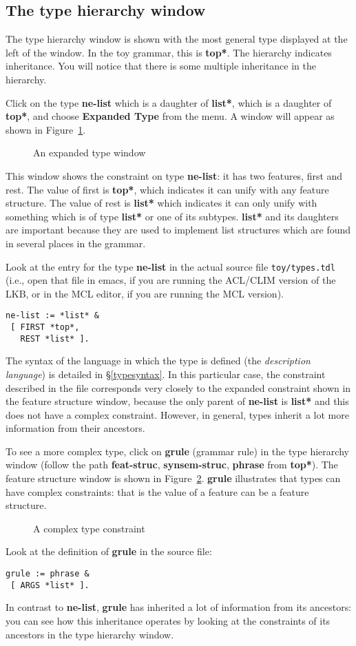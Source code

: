 \documentclass[12pt]{report}
\begin{document}
\subsection{The type hierarchy window}
The type hierarchy window is shown 
with the most
general type displayed at the left of the window.  In the toy grammar, 
this is {\bf *top*}.  The hierarchy indicates inheritance.
You will notice that there is some multiple inheritance in the hierarchy.

Click on the type {\bf ne-list}
which is a daughter of {\bf *list*}, which is a daughter of {\bf *top*},
and choose {\bf Expanded Type} from the menu.  A window will appear
as shown in Figure~\ref{ne-list}.
\begin{figure}
\epsfxsize=1in
\caption{An expanded type window}
\label{ne-list}
\end{figure}
This window shows the constraint on type {\bf ne-list}: it has
two features, {\sc first} and {\sc rest}.  The value of
{\sc first} is {\bf *top*}, which indicates it can unify with any
feature structure.  The value of {\sc rest} is {\bf *list*}
which indicates it can only unify with something which is
of type {\bf *list*} or one of its subtypes.  {\bf *list*} and 
its daughters are important because they are used to implement
list structures which are found in several places in the grammar.

Look at the entry for the type {\bf ne-list} in the actual source
file {\tt toy/types.tdl} (i.e., open that file in emacs, if you are
running the ACL/CLIM version of the LKB, or in the MCL editor, if you are
running the MCL version).
\begin{verbatim}
ne-list := *list* &
 [ FIRST *top*,
   REST *list* ].
\end{verbatim}
The syntax of the language in which the type is defined (the
{\it description language}) is detailed in \S\ref{typesyntax}.
In this particular case, the constraint described in the file corresponds
very closely to the expanded constraint shown in the
feature structure window, because the only parent of {\bf ne-list} is
{\bf *list*} and this does not have a complex constraint.
However, in general, types inherit a lot more information from
their ancestors.

To see a more complex type, click on {\bf grule} (grammar rule)
in the type hierarchy 
window (follow the path {\bf feat-struc}, {\bf synsem-struc}, {\bf phrase}
from {\bf *top*}).  The feature structure window is shown in
Figure~\ref{grule}.  {\bf grule} illustrates that types can have
complex constraints: that is the value of a feature can be
a feature structure.  
\begin{figure}
\epsfxsize=1in
\caption{A complex type constraint}
\label{grule}
\end{figure}
Look at the definition of {\bf grule} in the source file:
\begin{verbatim}
grule := phrase &
 [ ARGS *list* ].
\end{verbatim}
In contrast to {\bf ne-list}, {\bf grule} has inherited a lot of
information from its ancestors: you can see how this inheritance
operates by looking at the constraints of its ancestors in the
type hierarchy window.
\end{document}

